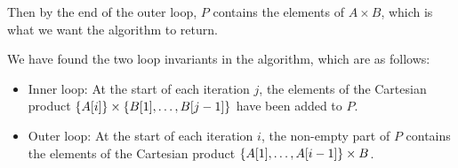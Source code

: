 \begin{example}
   Then by the end of the outer loop, $P$ contains the elements of $A \times B$, which is what we want the algorithm to return.

   We have found the two loop invariants in the algorithm, which are as follows:
   \begin{itemize}
       \item Inner loop: At the start of each iteration $j$, the elements of the Cartesian product $\left\{A[i]\right\} \times \left\{B[1],\ldots,B[j-1]\right\}$ have been added to $P$.

       \item Outer loop: At the start of each iteration $i$, the non-empty part of $P$ contains the elements of the Cartesian product $\left\{A[1],\ldots,A[i-1]\right\} \times B$.
   \end{itemize}
\end{example}

